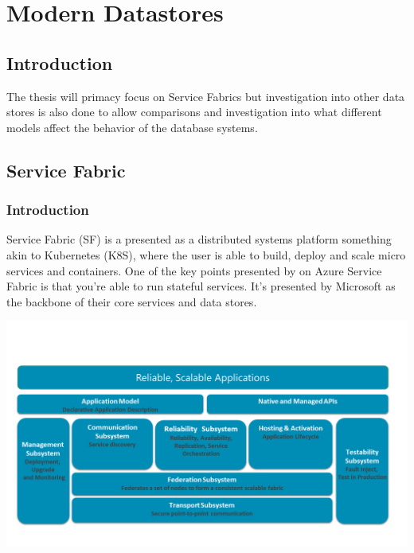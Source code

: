 \documentclass[a4paper,10pt,titlepage]{report}
\begin{document}



    \newpage


    \chapter{Modern Datastores}


    \section{Introduction}

    The thesis will primacy focus on Service Fabrics but investigation into other data stores is also done to allow comparisons and investigation into what different models affect the behavior of the database systems.


    \section{Service Fabric}

%

    \subsection{Introduction}

    Service Fabric (SF) is a presented as a distributed systems platform something akin to Kubernetes (K8S), where the user is able to build, deploy and scale micro services and containers. One of the key points presented by on Azure Service Fabric is that you're able to run stateful services. It's presented by Microsoft as the backbone of their core services and data stores.\\
    \vspace{5mm}

    \includegraphics[scale=0.5]{images/service-fabric-architecture.png}
\end{document}
